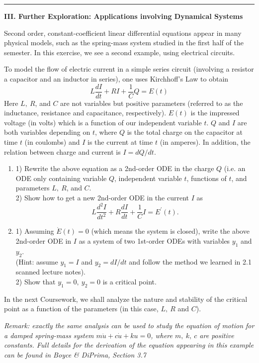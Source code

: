 \documentclass[11pt,a4paper,twoside]{article}
\begin{document}
	\rule{\textwidth}{0.4pt}
	\newpage
	\textbf{III. Further Exploration: Applications involving Dynamical Systems}\par
	Second order, constant-coefficient linear differential equations appear in many physical models, such as the spring-mass system studied in the first half of the semester. In this exercise, we see a second example, using electrical circuits.\par
	To model the flow of electric current in a simple series circuit (involving a resistor a capacitor and an inductor in series), one uses Kirchhoff’s Law to obtain
	$$
	L\frac{dI}{dt} + RI + \frac{1}{C}Q = E(t)
	$$
	Here $L,\ R$, and $C$ are not variables but positive parameters (referred to as the inductance, resistance and capacitance, respectively). $E(t)$ is the impressed voltage (in volts) which is a function of our independent variable $t$. $Q$ and $I$ are both variables depending on $t$, where $Q$ is the total charge on the capacitor at time $t$ (in coulombs) and $I$ is the current at time $t$ (in amperes). In addition, the relation between charge and current is $I = dQ/dt$.
	\begin{enumerate}[\bfseries A.]
		\item 1) Rewrite the above equation as a 2nd-order ODE in the charge $Q$ (i.e. an ODE only containing variable $Q$, independent variable $t$, functions of $t$, and parameters $L,\ R$, and $C$.\\
		2) Show how to get a new 2nd-order ODE in the current $I$ as
		$$
		L\frac{d^2I}{dt^2} + R\frac{dI}{dt} + \frac{1}{C}I = E^\prime(t).
		$$
		\item 1) Assuming $\dot{E}(t) = 0$ (which means the system is closed), write the above 2nd-order ODE in $I$ as a system of two 1st-order ODEs with variables $y_1$ and $y_2$.\\
		(Hint: assume $y_1 = I$ and $y_2 = dI/dt$ and follow the method we learned in 2.1 scanned lecture notes).\\
		2) Show that $y_1 = 0,\ y_2 = 0$ is a critical point.
	\end{enumerate}
	In the next Coursework, we shall analyze the nature and stability of the critical point as a function of the parameters (in this case, $L,\ R$ and $C$).\par
	\vspace{1.5cm}
	\textit{Remark: exactly the same analysis can be used to study the equation of motion for a damped spring-mass system $m\ddot{u} + c\dot{u} + ku = 0$, where $m,\ k,\ c$ are positive constants. Full details for the derivation of the equation appearing in this example can be found in Boyce \& DiPrima, Section 3.7}
\end{document}
